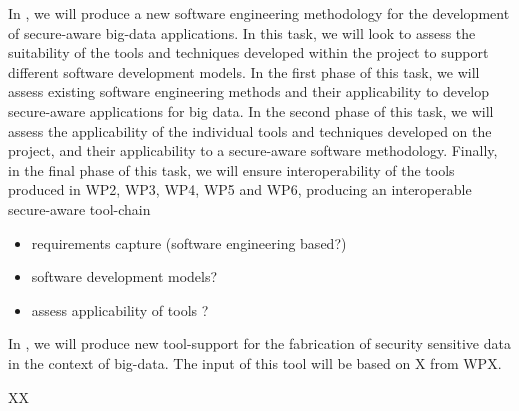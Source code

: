 \begin{Workpackage}{\thewpno}
\begin{Task}
	In \theTask, we will produce a new software engineering methodology for the development of secure-aware big-data applications. In this task, we will look to assess the suitability of the tools and techniques developed within the project to support different software development models. 
	In the first phase of this task, we will assess existing  software engineering methods and their applicability to develop secure-aware applications for big data.
	In the second phase of this task, we will assess the applicability of the individual tools and techniques developed on the \TheProject{} project, and their applicability to a secure-aware software methodology. 
	Finally, in the final phase of this task, we will ensure interoperability of the tools produced in WP2, WP3, WP4, WP5 and WP6, producing an interoperable secure-aware tool-chain
	\begin{itemize}
		\item requirements capture (software engineering based?)
		\item software development models?
		\item assess applicability of tools ?
	\end{itemize}
\end{Task}


\begin{Task}
	
	\TaskResults{%
	}
	\TaskHeader{}
	
	In \theTask, we will produce new tool-support for the fabrication of security sensitive data in the context of big-data. The input of this tool will be based on X from WPX. 
\end{Task}


%	
%	
%	




\begin{WPDeliverables}
  \begin{compactitem}
    \item XX
\end{compactitem}
\end{WPDeliverables}
\end{Workpackage}
